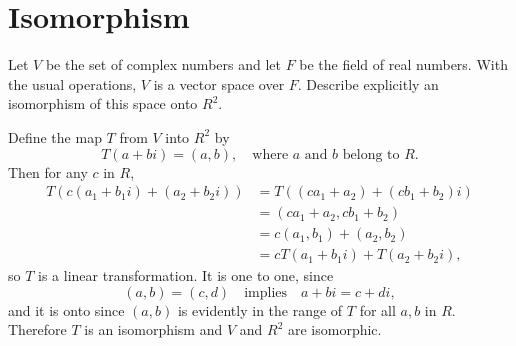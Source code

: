 \section{Isomorphism}

 Let $V$ be the set of complex numbers and let $F$ be the
field of real numbers. With the usual operations, $V$ is a vector
space over $F$. Describe explicitly an isomorphism of this space onto
$R^2$.
\begin{solution}
  Define the map $T$ from $V$ into $R^2$ by
  \begin{equation*}
    T(a + bi) = (a, b), \quad \text{where $a$ and $b$ belong to $R$.}
  \end{equation*}
  Then for any $c$ in $R$,
  \begin{align*}
    T(c(a_1 + b_1i) + (a_2 + b_2i))
    &= T((ca_1 + a_2) + (cb_1 + b_2)i) \\
    &= (ca_1 + a_2, cb_1 + b_2) \\
    &= c(a_1, b_1) + (a_2, b_2) \\
    &= cT(a_1 + b_1i) + T(a_2 + b_2i),
  \end{align*}
  so $T$ is a linear transformation. It is one to one, since
  \begin{equation*}
    (a,b) = (c,d) \quad\text{implies}\quad
    a + bi = c + di,
  \end{equation*}
  and it is onto since $(a, b)$ is evidently in the range of $T$ for
  all $a,b$ in $R$. Therefore $T$ is an isomorphism and $V$ and $R^2$
  are isomorphic.
\end{solution}

